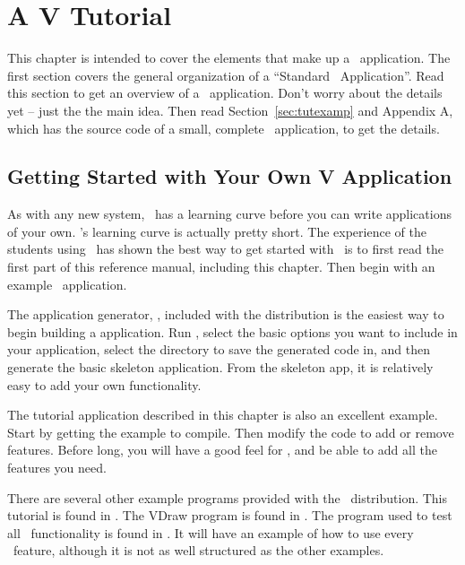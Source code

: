 \chapter{A V Tutorial}


This chapter is intended to cover the elements that make up a
\V\ application. The first section covers the general
organization of a ``Standard \V\ Application''. Read this section
to get an overview of a \V\ application. Don't worry about the details
yet -- just the the main idea. Then read Section~\ref{sec:tutexamp}
and Appendix A, which has the source code of a small, complete
\V\ application, to get the details.

\section{Getting Started with Your Own V Application}

As with any new system, \V\ has a learning curve before you can
write applications of your own. \V's learning curve is actually
pretty short. The experience of the students using \V\ has shown
the best way to get started with \V\ is to first read the first
part of this reference manual, including this chapter. Then begin
with an example \V\ application. 

The \V application generator, , included with the
\V distribution is the easiest way to begin building a \V
application. Run , select the basic options you
want to include in your application, select the directory
to save the generated code in, and then generate the basic
skeleton application. From the skeleton app, it is relatively
easy to add your own functionality.

The tutorial application described in this chapter is also an
excellent \V example. Start by getting the example to compile.
Then modify the code to add or remove features. Before long, you
will have a good feel for \V, and be able to add all the features
you need.

There are several other example programs provided with the \V\
distribution. This tutorial is found in .
The VDraw program is found in . The program
used to test all \V\ functionality is found in .
It will have an example of how to use every \V\ feature,
although it is not as well structured as the other examples.


